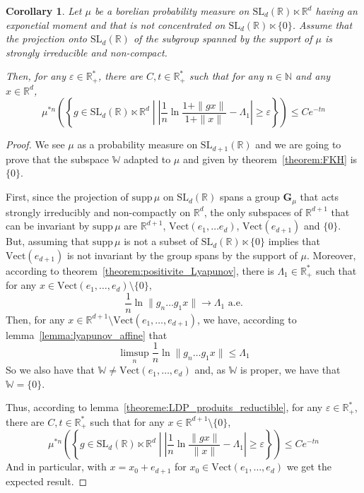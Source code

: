 \documentclass[11pt]{amsart}
\newtheorem{corollary}[theorem]{Corollary}
\theoremstyle{definition}
\theoremstyle{remark}
\numberwithin{equation}{section}
\begin{document}
\begin{corollary}\label{corollaire:longueurs_translations}
Let $\mu$ be a borelian probability measure on $\mathrm{SL}_d({\mathbb R}) \ltimes {\mathbb R}^d$ having an exponetial moment and that is not concentrated on $\mathrm{SL}_d({\mathbb R}) \ltimes\{0\}$. Assume that the projection onto $\mathrm{SL}_d({\mathbb R})$ of the subgroup spanned by the support of $\mu$ is strongly irreducible and non-compact.

Then, for any $\varepsilon \in {\mathbb R}_+^\ast$, there are $C,t\in {\mathbb R}_+^\ast$ such that for any $n\in {\mathbb N}$ and any $x\in{\mathbb R}^d$,
\[
\mu^{\ast n} \left(\left\{ g \in \mathrm{SL}_d({\mathbb R}) \ltimes {\mathbb R}^d \middle|  \left| \frac 1 n \ln\frac{1+\|gx\|}{1+\|x\|} - \Lambda_1 \right| \geqslant \varepsilon \right\}\right) \leqslant Ce^{-tn}
\]
\end{corollary}

\begin{proof}
We see $\mu$ as a probability measure on $\mathrm{SL}_{d+1}({\mathbb R})$ and we are going to prove that the subspace ${\mathbb W}$ adapted to $\mu$ and given by theorem~\ref{theorem:FKH} is $\{0\}$.

First, since the projection of ${\mathrm{supp}\,}\mu$ on $\mathrm{SL}_d({\mathbb R})$ spans a group ${\mathbf G}_\mu$ that acts strongly irreducibly and non-compactly on ${\mathbb R}^d$, the only subspaces of ${\mathbb R}^{d+1}$ that can be invariant by ${\mathrm{supp}\,}\mu$ are ${\mathbb R}^{d+1}$, $\mathrm{Vect}(e_1, \dots e_{d})$, $\mathrm{Vect}(e_{d+1})$ and $\{0\}$. But, assuming that ${\mathrm{supp}\,}\mu$ is not a subset of $\mathrm{SL}_d({\mathbb R}) \ltimes\{0\}$ implies that $\mathrm{Vect}(e_{d+1})$ is not invariant by the group spans by the support of $\mu$. Moreover, according to theorem~\ref{theorem:positivite_Lyapunov}, there is $\Lambda_1\in {\mathbb R}_+^\ast$ such that for any $x\in \mathrm{Vect}(e_1,\dots, e_d) \setminus\{0\}$,
\[
\frac 1 n \ln \|g_n \dots g_1 x\| \xrightarrow\, \Lambda_1 \text{ a.e.}
\]
Then, for any $x\in {\mathbb R}^{d+1} \setminus \mathrm{Vect}(e_1, \dots, e_{d+1})$, we have, according to lemma~\ref{lemma:lyapunov_affine} that
\[
\limsup_n \frac 1 n \ln \|g_n \dots g_1 x\| \leqslant \Lambda_1
\]
So we also have that ${\mathbb W} \not=\mathrm{Vect}(e_1, \dots ,e_d)$ and, as ${\mathbb W}$ is proper, we have that ${\mathbb W}=\{0\}$.

Thus, according to lemma~\ref{theoreme:LDP_produits_reductible}, for any $\varepsilon \in{\mathbb R}_+^\ast$, there are $C,t\in {\mathbb R}_+^\ast$ such that for any $x\in {\mathbb R}^{d+1} \setminus\{0\}$,
\[
\mu^{\ast n} \left( \left\{g \in \mathrm{SL}_d({\mathbb R}) \ltimes {\mathbb R}^d \middle| \left| \frac 1 n \ln \frac{\|gx\|}{\|x\|}- \Lambda_1 \right| \geqslant \varepsilon \right\}\right) \leqslant Ce^{-tn}
\]
And in particular, with $x=x_0+e_{d+1}$ for $x_0\in \mathrm{Vect}(e_1, \dots, e_d)$ we get the expected result.
\end{proof}



\end{document}
